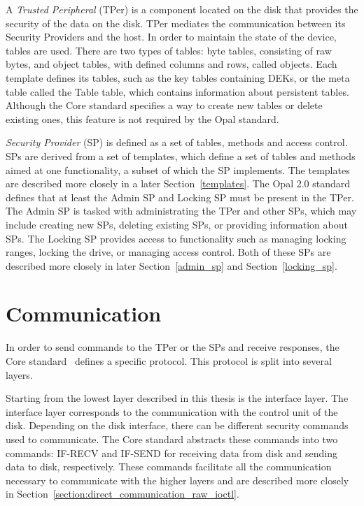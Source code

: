 
A \emph{Trusted Peripheral} (TPer) is a component located on the disk that provides the security of the data on the disk. 
TPer mediates the communication between its Security Providers and the host.
In order to maintain the state of the device, tables are used.
There are two types of tables: byte tables, consisting of raw bytes, and object tables, with defined columns and rows, called objects.
Each template defines its tables, such as the key tables containing DEKs, or the meta table called the Table table, which contains information about persistent tables.
Although the Core standard specifies a way to create new tables or delete existing ones, this feature is not required by the Opal standard.

\emph{Security Provider} (SP) is defined as a set of tables, methods and access control. SPs are derived from a set of templates, which define a set of tables and methods aimed at one functionality, a subset of which the SP implements. The templates are described more closely in a later Section~\ref{templates}.
The Opal 2.0 standard defines that at least the Admin SP and Locking SP must be present in the TPer. The Admin SP is tasked with administrating the TPer and other SPs, which may include creating new SPs, deleting existing SPs, or providing information about SPs. The Locking SP provides access to functionality such as managing locking ranges, locking the drive, or managing access control. Both of these SPs are described more closely in later Section~\ref{admin_sp} and Section~\ref{locking_sp}.



\section{Communication}
\label{opal_communication}

In order to send commands to the TPer or the SPs and receive responses, the Core standard~\cite{tcg-storage-core} defines a specific protocol.
This protocol is split into several layers.

Starting from the lowest layer described in this thesis is the interface layer. The interface layer corresponds to the communication with the control unit of the disk. Depending on the disk interface, there can be different security commands used to communicate. The Core standard abstracts these commands into two commands: IF-RECV and IF-SEND for receiving data from disk and sending data to disk, respectively. These commands facilitate all the communication necessary to communicate with the higher layers and are described more closely in Section~\ref{section:direct_communication_raw_ioctl}.

